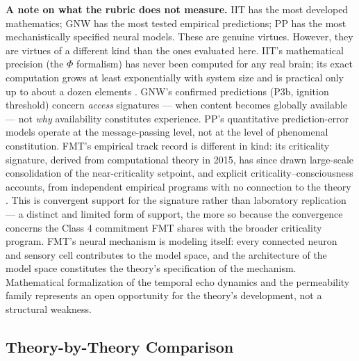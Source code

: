 \documentclass[12pt]{article}
\newcommand{\revstart}{}
\newcommand{\revend}{}
\begin{document}
{\revstart \textbf{A note on what the rubric does not measure.} IIT has the most developed mathematics; GNW has the most tested empirical predictions; PP has the most mechanistically specified neural models. These are genuine virtues. However, they are virtues of a different kind than the ones evaluated here. IIT's mathematical precision (the $\Phi$ formalism) has never been computed for any real brain; its exact computation grows at least exponentially with system size and is practical only up to about a dozen elements \citep{Mayner2018,Tegmark2016}. GNW's confirmed predictions (P3b, ignition threshold) concern \emph{access} signatures --- when content becomes globally available --- not \emph{why} availability constitutes experience. PP's quantitative prediction-error models operate at the message-passing level, not at the level of phenomenal constitution. FMT's empirical track record is different in kind: its criticality signature, derived from computational theory in 2015, has since drawn large-scale consolidation of the near-criticality setpoint, and explicit criticality--consciousness accounts, from independent empirical programs with no connection to the theory \citep{HengenShew2025,AlgomShriki2026,Toker2026}. This is convergent support for the signature rather than laboratory replication --- a distinct and limited form of support, the more so because the convergence concerns the Class 4 commitment FMT shares with the broader criticality program. FMT's neural mechanism is modeling itself: every connected neuron and sensory cell contributes to the model space, and the architecture of the model space constitutes the theory's specification of the mechanism. Mathematical formalization of the temporal echo dynamics and the permeability family represents an open opportunity for the theory's development, not a structural weakness.\revend}


\subsection{Theory-by-Theory Comparison}
\end{document}

